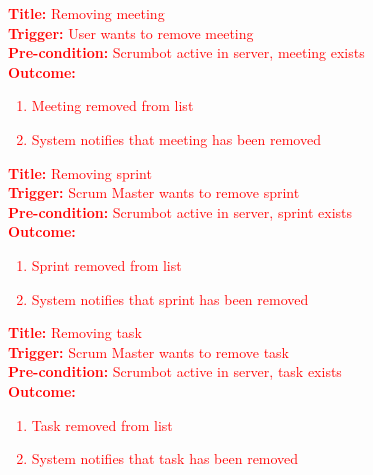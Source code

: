 \documentclass[12pt, titlepage]{article}
\begin{document}
\noindent \textcolor{red}{\textbf{Title: }Removing meeting}\\
\textcolor{red}{\textbf{Trigger: }User wants to remove meeting}\\
\textcolor{red}{\textbf{Pre-condition: }Scrumbot active in server, meeting exists}\\
\textcolor{red}{\textbf{Outcome: }}
\textcolor{red}{
\begin{enumerate}
    \item Meeting removed from list
    \item System notifies that meeting has been removed
\end{enumerate}
}

\noindent \textcolor{red}{\textbf{Title: }Removing sprint}\\
\textcolor{red}{\textbf{Trigger: }Scrum Master wants to remove sprint}\\
\textcolor{red}{\textbf{Pre-condition: }Scrumbot active in server, sprint exists}\\
\textcolor{red}{\textbf{Outcome: }}
\textcolor{red}{
\begin{enumerate}
    \item Sprint removed from list
    \item System notifies that sprint has been removed
\end{enumerate}
}

\noindent \textcolor{red}{\textbf{Title: }Removing task}\\
\textcolor{red}{\textbf{Trigger: }Scrum Master wants to remove task}\\
\textcolor{red}{\textbf{Pre-condition: }Scrumbot active in server, task exists}\\
\textcolor{red}{\textbf{Outcome: }}
\textcolor{red}{
\begin{enumerate}
    \item Task removed from list
    \item System notifies that task has been removed
\end{enumerate}
}
\end{document}
